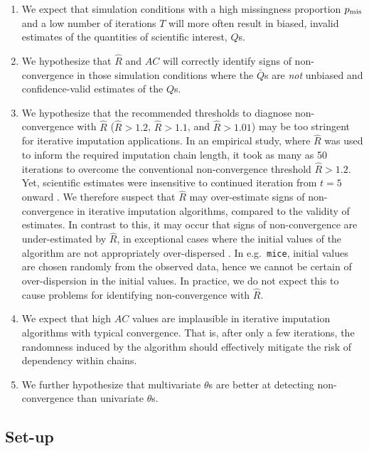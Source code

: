 \documentclass[Royal,times,sageh]{sagej}
\begin{document}
\begin{enumerate}
\def\labelenumi{\arabic{enumi}.}
\item
  We expect that simulation conditions with a high missingness proportion \(p_{\rm mis}\) and a low number of iterations \(T\) will more often result in biased, invalid estimates of the quantities of scientific interest, \(Q\)s.
\item
  We hypothesize that \(\widehat{R}\) and \(AC\) will correctly identify signs of non-convergence in those simulation conditions where the \(\bar{Q}\)s are \emph{not} unbiased and confidence-valid estimates of the \(Q\)s.
\item
  We hypothesize that the recommended thresholds to diagnose non-convergence with \(\widehat{R}\) (\(\widehat{R} > 1.2\), \(\widehat{R} > 1.1\), and \(\widehat{R} > 1.01\)) may be too stringent for iterative imputation applications. In an empirical study, where \(\widehat{R}\) was used to inform the required imputation chain length, it took as many as 50 iterations to overcome the conventional non-convergence threshold \(\widehat{R}>1.2\). Yet, scientific estimates were insensitive to continued iteration from \(t=5\) onward \citep{lace07}. We therefore suspect that \(\widehat{R}\) may over-estimate signs of non-convergence in iterative imputation algorithms, compared to the validity of estimates. In contrast to this, it may occur that signs of non-convergence are under-estimated by \(\widehat{R}\), in exceptional cases where the initial values of the algorithm are not appropriately over-dispersed \citep[p.~437]{broo98}. In e.g.~\texttt{mice}, initial values are chosen randomly from the observed data, hence we cannot be certain of over-dispersion in the initial values. In practice, we do not expect this to cause problems for identifying non-convergence with \(\widehat{R}\).
\item
  We expect that high \(AC\) values are implausible in iterative imputation algorithms with typical convergence. That is, after only a few iterations, the randomness induced by the algorithm should effectively mitigate the risk of dependency within chains.
\item
  We further hypothesize that multivariate \(\theta\)s are better at detecting non-convergence than univariate \(\theta\)s.
\end{enumerate}

\hypertarget{set-up}{%
\subsection{Set-up}\label{set-up}}
\end{document}
